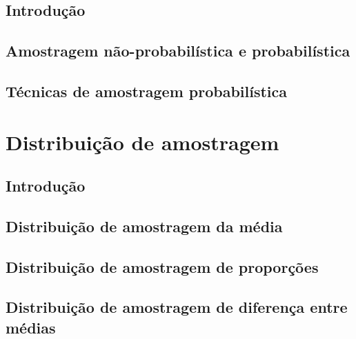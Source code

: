 \documentclass[
]{book}
\begin{document}
\hypertarget{introduuxe7uxe3o-4}{%
\section{Introdução}\label{introduuxe7uxe3o-4}}

\hypertarget{amostragem-nuxe3o-probabiluxedstica-e-probabiluxedstica}{%
\section{Amostragem não-probabilística e probabilística}\label{amostragem-nuxe3o-probabiluxedstica-e-probabiluxedstica}}

\hypertarget{tuxe9cnicas-de-amostragem-probabiluxedstica}{%
\section{Técnicas de amostragem probabilística}\label{tuxe9cnicas-de-amostragem-probabiluxedstica}}

\hypertarget{chap:cap8}{%
\chapter{Distribuição de amostragem}\label{chap:cap8}}

\hypertarget{introduuxe7uxe3o-5}{%
\section{Introdução}\label{introduuxe7uxe3o-5}}

\hypertarget{distribuiuxe7uxe3o-de-amostragem-da-muxe9dia}{%
\section{Distribuição de amostragem da média}\label{distribuiuxe7uxe3o-de-amostragem-da-muxe9dia}}

\hypertarget{distribuiuxe7uxe3o-de-amostragem-de-proporuxe7uxf5es}{%
\section{Distribuição de amostragem de proporções}\label{distribuiuxe7uxe3o-de-amostragem-de-proporuxe7uxf5es}}

\hypertarget{distribuiuxe7uxe3o-de-amostragem-de-diferenuxe7a-entre-muxe9dias}{%
\section{Distribuição de amostragem de diferença entre médias}\label{distribuiuxe7uxe3o-de-amostragem-de-diferenuxe7a-entre-muxe9dias}}
\end{document}

